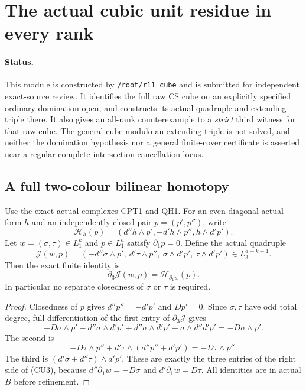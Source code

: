 \section{The actual cubic unit residue in every rank}
\label{sec:r11-cubic-unit-residue}

\paragraph{Status.}
This module is constructed by \texttt{/root/r11\_cube} and is submitted
for independent exact-source review.  It identifies the full raw CS
cube on an explicitly specified ordinary domination open, and constructs
its actual quadruple and extending triple there.  It also gives an
all-rank counterexample to a \emph{strict} third witness for that raw
cube.  The general cube modulo an extending triple is not solved, and
neither the domination hypothesis nor a general finite-cover certificate
is asserted near a regular complete-intersection cancellation locus.

\subsection{A full two-colour bilinear homotopy}

Use the exact actual complexes CPT1 and QH1.  For an even diagonal
actual form $h$ and an independently closed pair $p=(p',p'')$, write
\[
 \mathcal H_h(p)=(d''h\wedge p',-d'h\wedge p'',h\wedge d'p').
 \tag{CU1}
\]
Let $w=(\sigma,\tau)\in L_1^k$ and $p\in L_1^a$ satisfy
$\partial_1p=0$.  Define the actual quadruple
\[
 \mathcal J(w,p)=
 (-d''\sigma\wedge p',\ d'\tau\wedge p'',\
                  \sigma\wedge d'p',\ \tau\wedge d'p')
                                      \in L_3^{a+k+1}.
 \tag{CU2}
\]
Then the exact finite identity is
\[
       \partial_3\mathcal J(w,p)=\mathcal H_{\partial_1w}(p).
 \tag{CU3}
\]
In particular no separate closedness of $\sigma$ or $\tau$ is required.

\begin{proof}
Closedness of $p$ gives $d''p''=-d'p'$ and $Dp'=0$.  Since
$\sigma,\tau$ have odd total degree, full differentiation of the
first entry of $\partial_3\mathcal J$ gives
\[
 -D\sigma\wedge p'-d''\sigma\wedge d'p'
          +d''\sigma\wedge d'p'-\sigma\wedge d''d'p'
                  =-D\sigma\wedge p'.
 \tag{CU4}
\]
The second is
\[
 -D\tau\wedge p''+d'\tau\wedge(d''p''+d'p')
                  =-D\tau\wedge p''.
 \tag{CU5}
\]
The third is $(d'\sigma+d''\tau)\wedge d'p'$.
These are exactly the three entries of the right side of (CU3),
because $d''\partial_1w=-D\sigma$ and $d'\partial_1w=D\tau$.
All identities are in actual $B$ before refinement.
\end{proof}

